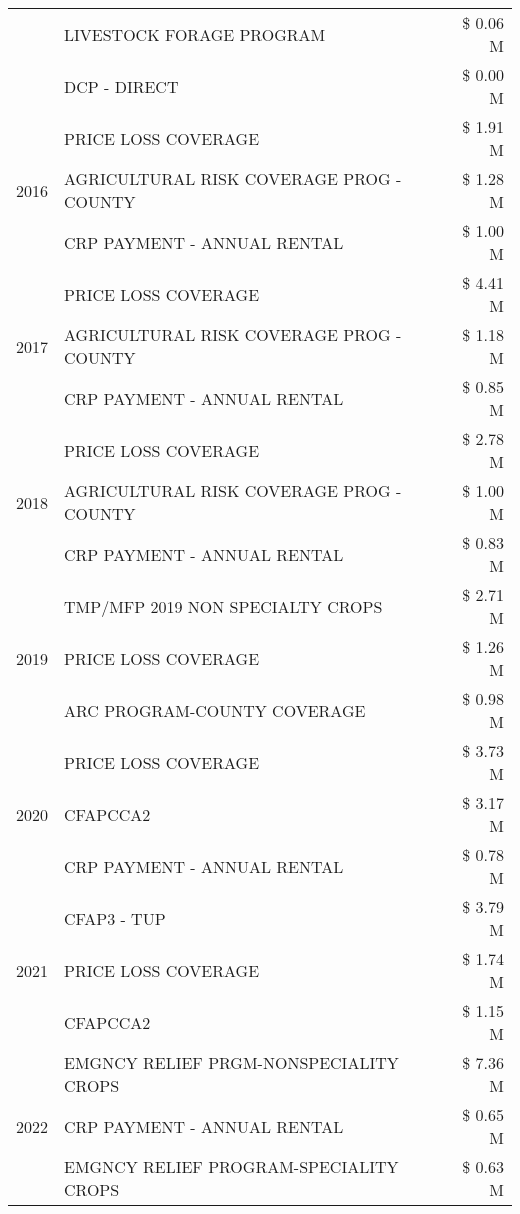 \begin{tabular}{llr}
 & LIVESTOCK FORAGE PROGRAM & \$ 0.06 M \\
 & DCP - DIRECT & \$ 0.00 M \\
\cline{1-3}
\multirow[t]{3}{*}{2016} & PRICE LOSS COVERAGE & \$ 1.91 M \\
 & AGRICULTURAL RISK COVERAGE PROG - COUNTY & \$ 1.28 M \\
 & CRP PAYMENT - ANNUAL RENTAL & \$ 1.00 M \\
\cline{1-3}
\multirow[t]{3}{*}{2017} & PRICE LOSS COVERAGE & \$ 4.41 M \\
 & AGRICULTURAL RISK COVERAGE PROG - COUNTY & \$ 1.18 M \\
 & CRP PAYMENT - ANNUAL RENTAL & \$ 0.85 M \\
\cline{1-3}
\multirow[t]{3}{*}{2018} & PRICE LOSS COVERAGE & \$ 2.78 M \\
 & AGRICULTURAL RISK COVERAGE PROG - COUNTY & \$ 1.00 M \\
 & CRP PAYMENT - ANNUAL RENTAL & \$ 0.83 M \\
\cline{1-3}
\multirow[t]{3}{*}{2019} & TMP/MFP 2019 NON SPECIALTY CROPS & \$ 2.71 M \\
 & PRICE LOSS COVERAGE & \$ 1.26 M \\
 & ARC PROGRAM-COUNTY COVERAGE & \$ 0.98 M \\
\cline{1-3}
\multirow[t]{3}{*}{2020} & PRICE LOSS COVERAGE & \$ 3.73 M \\
 & CFAPCCA2 & \$ 3.17 M \\
 & CRP PAYMENT - ANNUAL RENTAL & \$ 0.78 M \\
\cline{1-3}
\multirow[t]{3}{*}{2021} & CFAP3 - TUP & \$ 3.79 M \\
 & PRICE LOSS COVERAGE & \$ 1.74 M \\
 & CFAPCCA2 & \$ 1.15 M \\
\cline{1-3}
\multirow[t]{3}{*}{2022} & EMGNCY RELIEF PRGM-NONSPECIALITY CROPS & \$ 7.36 M \\
 & CRP PAYMENT - ANNUAL RENTAL & \$ 0.65 M \\
 & EMGNCY RELIEF PROGRAM-SPECIALITY CROPS & \$ 0.63 M \\
\cline{1-3}
\bottomrule
\end{tabular}
